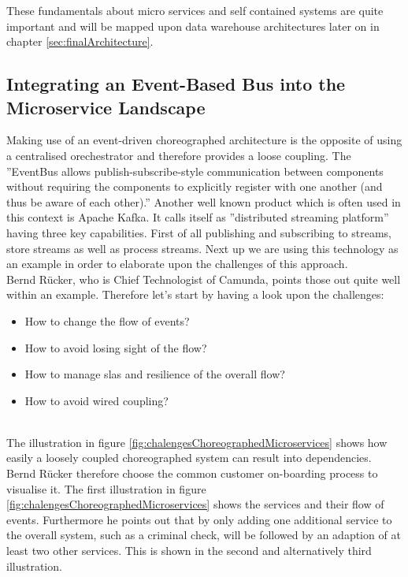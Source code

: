 These fundamentals about micro services and self contained systems are quite important and will be mapped upon data warehouse architectures later on in chapter \ref{sec:finalArchitecture}.

\subsection{Integrating an Event-Based Bus into the Microservice  Landscape}
\label{sec:eventBasedArchitecture}
Making use of an event-driven choreographed architecture is the opposite of using a centralised orechestrator and therefore provides a loose coupling. The ''EventBus allows publish-subscribe-style communication between components without requiring the components to explicitly register with one another (and thus be aware of each other).'' \cite{EventBusExplained} \newline
Another well known product which is often used in this context is Apache Kafka. It calls itself as ''distributed streaming platform'' having three key capabilities. First of all publishing and subscribing to streams, store streams as well as process streams.\cite{kafka}
Next up we are using this technology as an example in order to elaborate upon the challenges of this approach.\newline
\\
Bernd Rücker, who is Chief Technologist of Camunda, points those out quite well within an example. Therefore let's start by having a look upon the challenges:
\begin{itemize}
    \item How to change the flow of events?
    \item How to avoid losing sight of the flow?
    \item How to manage \acrshort{sla}s and resilience of the overall flow?
    \item How to avoid wired coupling?
\end{itemize}
\cite{eventDrivenMicroservices}\newline
\\
The illustration in figure \ref{fig:chalengesChoreographedMicroservices} shows how easily a loosely coupled choreographed system can result into dependencies. Bernd Rücker therefore choose the common customer on-boarding process to visualise it. The first illustration in figure \ref{fig:chalengesChoreographedMicroservices} shows the services and their flow of events. Furthermore he points out that by only adding one additional service to the overall system, such as a criminal check, will be followed by an adaption of at least two other services. This is shown in the second and alternatively third illustration.\cite{eventDrivenMicroservices}\newline
